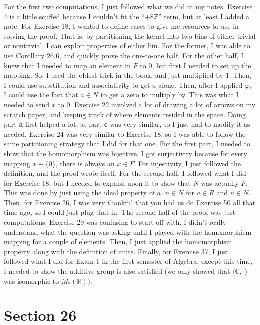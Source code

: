 \documentclass[12pt, oneside]{book}
\newcommand{\Z}{\mathbb{Z}}
\newcommand{\R}{\mathbb{R}}
\newcommand{\C}{\mathbb{C}}
\newcommand{\gen}[1]{\langle #1 \rangle}
\begin{document}
For the first two computations, I just followed what we did in my notes. Exercise 4 is a little scuffed because I couldn't fit the ``\(+8\Z\)'' term, but at least I added a note. For Exercise 18, I wanted to define cases to give me resources to use in solving the proof. That is, by partitioning the kernel into two bins of either trivial or nontrivial, I can exploit properties of either bin. For the former, I was able to use Corollary 26.6, and quickly prove the one-to-one half. For the other half, I knew that I needed to map an element in \(F\) to 0, but first I needed to set up the mapping. So, I used the oldest trick in the book, and just multiplied by 1. Then, I could use substitution and associativity to get \(a\) alone. Then, after I applied \(\varphi\), I could use the fact that \(a \in N\) to get a zero to multiply by. This was what I needed to send \(x\) to 0. Exercise 22 involved a lot of drawing a lot of arrows on my scratch paper, and keeping track of where elements resided in the space. Doing part \textbf{a} first helped a lot, as part \textbf{c} was very similar, so I just had to modify it as needed. Exercise 24 was very similar to Exercise 18, so I was able to follow the same partitioning strategy that I did for that one. For the first part, I needed to show that the homomorphism was bijective. I got surjectivity because for every mapping \(x + \{0\}\), there is always an \(x \in F\). For injectivity, I just followed the definition, and the proof wrote itself. For the second half, I followed what I did for Exercise 18, but I needed to expand upon it to show that \(N\) was actually \(F\). This was done by just using the ideal property of \(a \cdot n \in N\) for \(a \in R\) and \(n \in N\). Then, for Exercise 26, I was very thankful that you had us do Exercise 50 all that time ago, so I could just plug that in. The second half of the proof was just computations. Exercise 29 was confusing to start off with. I didn't really understand what the question was asking until I played with the homomorphism mapping for a couple of elements. Then, I just applied the homomorphism property along with the definition of units. Finally, for Exercise 37, I just followed what I did for Exam 1 in the first semester of Algebra, except this time, I needed to show the additive group is also satisfied (we only showed that \(\gen{\C, \cdot}\) was isomorphic to \(M_{2}(\R)\)).

\newpage
\section*{Section 26}
\end{document}

